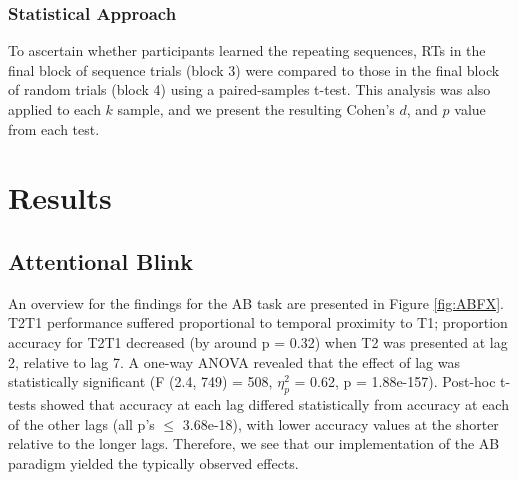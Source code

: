 \documentclass{article}
\begin{document}
\hypertarget{statistical-approach-2}{%
\subsubsection{Statistical Approach}\label{statistical-approach-2}}

To ascertain whether participants learned the repeating sequences, RTs in the final block of sequence trials (block 3) were compared to those in the final block of random trials (block 4) using a paired-samples t-test. This analysis was also applied to each \(k\) sample, and we present the resulting Cohen's \(d\), and \(p\) value from each test.

\hypertarget{results}{%
\section{Results}\label{results}}

\label{sec:Results}

\hypertarget{attentional-blink}{%
\subsection{Attentional Blink}\label{attentional-blink}}

\label{sec:ABRes}

An overview for the findings for the AB task are presented in Figure \ref{fig:ABFX}. T2\textbar T1 performance suffered proportional to temporal proximity to T1; proportion accuracy for T2\textbar T1 decreased (by around p = 0.32) when T2 was presented at lag 2, relative to lag 7. A one-way ANOVA revealed that the effect of lag was statistically significant (F (2.4, 749) = 508, \(\eta_{p}^2\) = 0.62, p = 1.88e-157). Post-hoc t-tests showed that accuracy at each lag differed statistically from accuracy at each of the other lags (all p's \(\leq\) 3.68e-18), with lower accuracy values at the shorter relative to the longer lags. Therefore, we see that our implementation of the AB paradigm yielded the typically observed effects.
\end{document}
